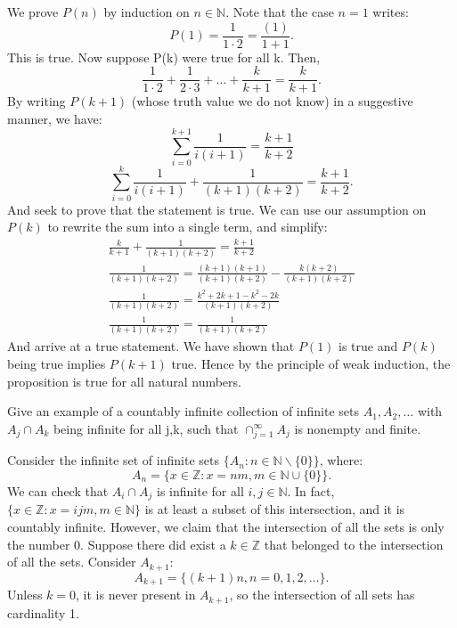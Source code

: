 \documentclass[11 pt]{article}
\begin{document}
\begin{problem}
	\begin{solution}
	We prove $P(n)$ by induction on $n\in\mathbb{N}$.
	 Note that the case $n=1$ writes: \\
	\[
	P(1)=\frac{1}{1\cdot2}=\frac{(1)}{1+1}
	.\]
	This is true. Now suppose P(k) were true for all k. Then, 
	\[
	\frac{1}{1\cdot2}+\frac{1}{2\cdot3}+\ldots+\frac{k}{k+1}=\frac{k}{k+1}
	.\]
	By writing $P(k+1)$ (whose truth value we do not know) in a suggestive manner, we have:
	\[
	\sum^{k+1}_{i=0}{\frac{1}{i(i+1)}} = \frac{k+1}{k+2}
	\]
	\[
	\sum^{k}_{i=0}{\frac{1}{i(i+1)}} +\frac{1}{(k+1)(k+2)}=\frac{k+1}{k+2}
	.\] 
And seek to prove that the statement is true. We can use our assumption on $P(k)$ to rewrite the sum into a single term, and simplify:
\begin{gather*}
	\frac{k}{k+1}+\frac{1}{(k+1)(k+2)} =\frac{k+1}{k+2} \\
	\frac{1}{(k+1)(k+2)}=\frac{(k+1)(k+1)}{(k+1)(k+2)}-\frac{k(k+2)}{(k+1)(k+2)} \\
	\frac{1}{(k+1)(k+2)}=\frac{k^{2}+2k+1-k^{2}-2k}{(k+1)(k+2)} \\
	\frac{1}{(k+1)(k+2)}=\frac{1}{(k+1)(k+2)}
\end{gather*}
And arrive at a true statement. 
We have shown that $P(1)$ is true and $P(k)$ being true implies $P(k+1)$ true. Hence by the principle of weak induction, the proposition is true for all natural numbers.
\end{solution}
\pagebreak
\begin{problem}
	Give an example of a countably infinite collection of infinite sets $A_1, A_2, \dots$ with $A_j\cap A_k$ being infinite for all j,k, such that $\cap_{j=1}^{\infty}A_{j}$ is nonempty and finite.
\end{problem}
\begin{solution}
	Consider the infinite set of infinite sets $\{A_n : n\in \mathbb{N}\backslash\{0\}\}$, where:
	\[
	A_{n}=\{x\in \mathbb{Z}:x=nm, m\in \mathbb{N}\cup\{0\}\}
	.\] 
We can check that $A_i\cap A_j$ is infinite for all $i,j \in \mathbb{N}$. In fact, $\{x\in \mathbb{Z}: x=ijm, m\in \mathbb{N}\}$ is at least a subset of this intersection, and it is countably infinite.
However, we claim that the intersection of all the sets is only the number 0.
Suppose there did exist a $k\in \mathbb{Z}$ that belonged to the intersection of all the sets. Consider $A_{k+1}$:
\[
	A_{k+1}=\{(k+1)n, n=0,1,2,\dots\}
.\] 
Unless $k=0$, it is never present in $A_{k+1}$, so the intersection of all sets has cardinality 1.


\end{solution}
\end{problem}
\end{document}
